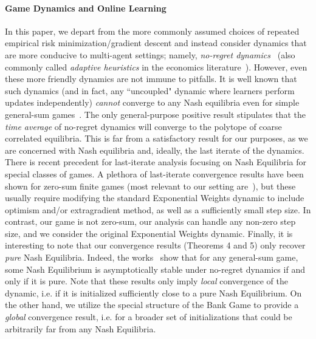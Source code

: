 \paragraph{Game Dynamics and Online Learning} In this paper, we depart from the more commonly assumed choices of repeated empirical risk minimization/gradient descent and instead consider dynamics that are more conducive to multi-agent settings; namely, \emph{no-regret dynamics}~\cite{freund1999adaptive} (also commonly called \emph{adaptive heuristics} in the economics literature~\cite{hart2005adaptive}).
However, even these more friendly dynamics are not immune to pitfalls. It is well known that such dynamics (and in fact, any ``uncoupled" dynamic where learners perform updates independently) \emph{cannot} converge to any Nash equilibria even for simple general-sum games~\cite{hart2003uncoupled}.
The only general-purpose positive result stipulates that the \emph{time average} of no-regret dynamics will converge to the polytope of coarse correlated equilibria. 
This is far from a satisfactory result for our purposes, as we are concerned with Nash equilibria and, ideally, the last iterate of the dynamics.
There is recent precedent for last-iterate analysis focusing on Nash Equilibria for special classes of games.
A plethora of last-iterate convergence results have been shown for zero-sum finite games (most relevant to our setting are~\cite{daskalakis2019last,cai2022finite}), but these usually require modifying the standard Exponential Weights dynamic to include optimism and/or extragradient method, as well as a sufficiently small step size.
In contrast, our game is not zero-sum, our analysis can handle any non-zero step size, and we consider the original Exponential Weights dynamic.
Finally, it is interesting to note that our convergence results (Theorems 4 and 5) only recover \emph{pure} Nash Equilibria.
Indeed, the works~\cite{vlatakis2020no,giannou2021survival} show that for any general-sum game, some Nash Equilibrium is asymptotically stable under no-regret dynamics if and only if it is pure. Note that these results only imply \emph{local} convergence of the dynamic, i.e. if it is initialized sufficiently close to a pure Nash Equilibrium.
On the other hand, we utilize the special structure of the Bank Game to provide a \emph{global} convergence result, i.e. for a broader set of initializations that could be arbitrarily far from any Nash Equilibria.


%